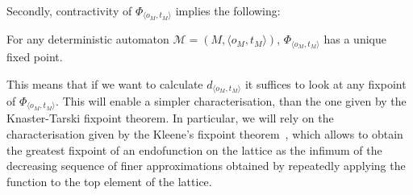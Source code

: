 Secondly, contractivity of $\Phi_{\langle o_M, t_M\rangle}$ implies the following:
\begin{corollary}\label{c2:lem:uniquefp}
    For any deterministic automaton $\mathcal{M} = (M, \langle o_M, t_M\rangle)$, $\Phi_{\langle o_M, t_M\rangle}$ has a unique fixed point.
\end{corollary}
This means that if we want to calculate $d_{\langle o_M, t_M\rangle}$ it suffices to look at any fixpoint of $\Phi_{\langle o_M, t_M\rangle}$. This will enable a simpler characterisation, than the one given by the Knaster-Tarski fixpoint theorem. In particular, we will rely on the characterisation given by the Kleene's fixpoint theorem~\cite[Theorem~2.8.5]{Sangiorgi:2011:Coinduction}, which allows to obtain the greatest fixpoint of an endofunction on the lattice as the infimum of the decreasing sequence of finer approximations obtained by repeatedly applying the function to the top element of the lattice.

